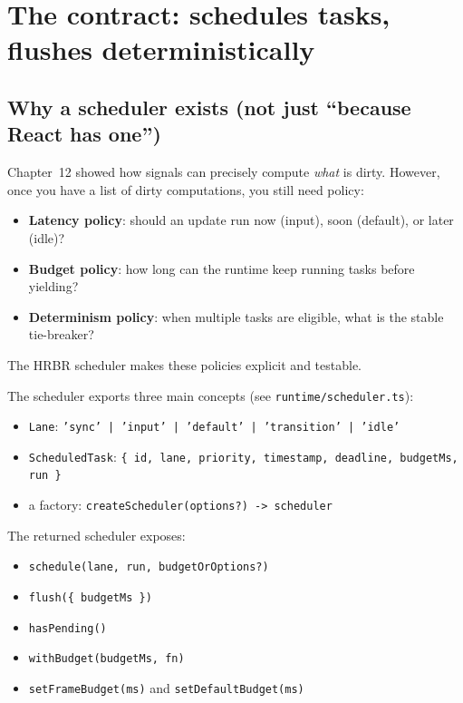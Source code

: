 \section{The contract: schedules tasks, flushes deterministically}

\subsection{Why a scheduler exists (not just ``because React has one'')}

Chapter~12 showed how signals can precisely compute \emph{what} is dirty.
However, once you have a list of dirty computations, you still need policy:

\begin{itemize}
  \item \textbf{Latency policy}: should an update run now (input), soon (default), or later (idle)?
  \item \textbf{Budget policy}: how long can the runtime keep running tasks before yielding?
  \item \textbf{Determinism policy}: when multiple tasks are eligible, what is the stable tie-breaker?
\end{itemize}

The HRBR scheduler makes these policies explicit and testable.

The scheduler exports three main concepts (see \texttt{runtime/scheduler.ts}):

\begin{itemize}
  \item \texttt{Lane}: \texttt{'sync' | 'input' | 'default' | 'transition' | 'idle'}
  \item \texttt{ScheduledTask}: \texttt{\{ id, lane, priority, timestamp, deadline, budgetMs, run \}}
  \item a factory: \texttt{createScheduler(options?) -> scheduler}
\end{itemize}

The returned scheduler exposes:

\begin{itemize}
  \item \texttt{schedule(lane, run, budgetOrOptions?)}
  \item \texttt{flush(\{ budgetMs \})}
  \item \texttt{hasPending()}
  \item \texttt{withBudget(budgetMs, fn)}
  \item \texttt{setFrameBudget(ms)} and \texttt{setDefaultBudget(ms)}
\end{itemize}

